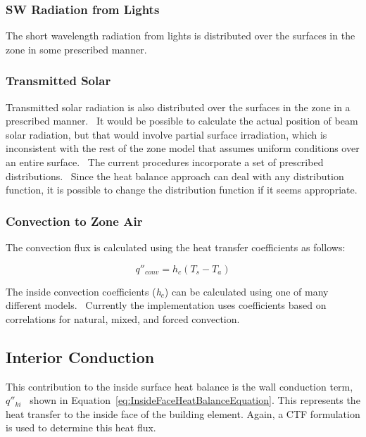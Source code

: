 \subsubsection{SW Radiation from Lights}\label{sw-radiation-from-lights}

The short wavelength radiation from lights is distributed over the surfaces in the zone in some prescribed manner.

\subsubsection{Transmitted Solar}\label{transmitted-solar}

Transmitted solar radiation is also distributed over the surfaces in the zone in a prescribed manner.~ It would be possible to calculate the actual position of beam solar radiation, but that would involve partial surface irradiation, which is inconsistent with the rest of the zone model that assumes uniform conditions over an entire surface.~ The current procedures incorporate a set of prescribed distributions.~ Since the heat balance approach can deal with any distribution function, it is possible to change the distribution function if it seems appropriate.

\subsubsection{Convection to Zone Air}\label{convection-to-zone-air}

The convection flux is calculated using the heat transfer coefficients as follows:

\begin{equation}
{q''_{conv}} = {h_c}({T_s} - {T_a})
\end{equation}

The inside convection coefficients (\emph{h\(_{c}\)}) can be calculated using one of many different models.~ Currently the implementation uses coefficients based on correlations for natural, mixed, and forced convection.

\subsection{Interior Conduction}\label{interior-conduction}

This contribution to the inside surface heat balance is the wall conduction term, \({q''_{ki}}\) ~shown in Equation~\ref{eq:InsideFaceHeatBalanceEquation}. This represents the heat transfer to the inside face of the building element. Again, a CTF formulation is used to determine this heat flux.

